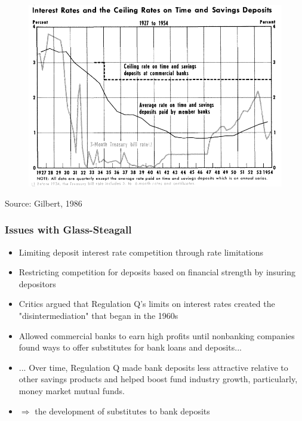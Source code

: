 \documentclass[11pt]{beamer}
\begin{document}
\begin{frame}
\begin{figure}
\includegraphics[width=\textwidth]{Interestceiling1.png}
\end{figure}
\tiny{Source: Gilbert, 1986}
\end{frame}
\begin{frame}
\frametitle{Issues with Glass-Steagall}

\begin{itemize}
\item Limiting deposit interest rate competition through rate limitations
\item Restricting competition for deposits based on financial strength by insuring depositors
\item Critics argued that Regulation Q's limits on interest rates created the "disintermediation" that began in the 1960s
\item Allowed commercial banks to earn high profits until nonbanking companies found ways to offer substitutes for bank loans and deposits...
\item ... Over time, Regulation Q made bank deposits less attractive relative to other savings products and helped boost fund industry growth,
particularly, money market mutual funds.
\item $\Rightarrow$ the development of substitutes to bank deposits




\end{itemize}


\end{frame}
\end{document}
